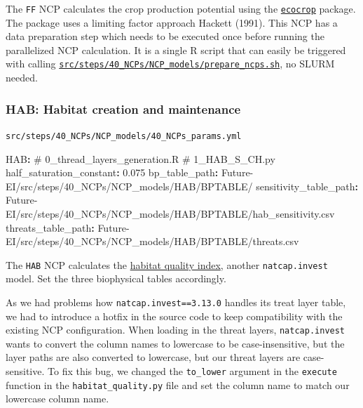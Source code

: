 \documentclass[
  letterpaper,
  DIV=11,
  numbers=noendperiod]{scrreprt}
\newenvironment{Shaded}{\begin{snugshade}}{\end{snugshade}}
\newcommand{\AttributeTok}[1]{\textcolor[rgb]{0.40,0.45,0.13}{#1}}
\newcommand{\CommentTok}[1]{\textcolor[rgb]{0.37,0.37,0.37}{#1}}
\newcommand{\FloatTok}[1]{\textcolor[rgb]{0.68,0.00,0.00}{#1}}
\newcommand{\FunctionTok}[1]{\textcolor[rgb]{0.28,0.35,0.67}{#1}}
\newcommand{\KeywordTok}[1]{\textcolor[rgb]{0.00,0.23,0.31}{\textbf{#1}}}
\begin{document}
The \texttt{FF} NCP calculates the crop production potential using the
\href{https://cropmodels.r-universe.dev/Recocrop}{\texttt{ecocrop}}
package. The package uses a limiting factor approach Hackett (1991).
This NCP has a data preparation step which needs to be executed once
before running the parallelized NCP calculation. It is a single R script
that can easily be triggered with calling
\href{https://github.com/cbueth/Future-EI/tree/main/src/steps/40_NCPs/NCP_models/prepare_ncps.sh}{\texttt{src/steps/40\_NCPs/NCP\_models/prepare\_ncps.sh}},
no SLURM needed.

\subsubsection{HAB: Habitat creation and maintenance}\label{HAB}

\begin{codelisting}

\caption{\texttt{src/steps/40\_NCPs/NCP\_models/40\_NCPs\_params.yml}}

\begin{Shaded}
\begin{Highlighting}[]
\FunctionTok{HAB}\KeywordTok{:}
\CommentTok{  \# 0\_thread\_layers\_generation.R}
\CommentTok{  \# 1\_HAB\_S\_CH.py}
\AttributeTok{  }\FunctionTok{half\_saturation\_constant}\KeywordTok{:}\AttributeTok{ }\FloatTok{0.075}
\AttributeTok{  }\FunctionTok{bp\_table\_path}\KeywordTok{:}
\AttributeTok{    Future{-}EI/src/steps/40\_NCPs/NCP\_models/HAB/BPTABLE/}
\AttributeTok{  }\FunctionTok{sensitivity\_table\_path}\KeywordTok{:}
\AttributeTok{    Future{-}EI/src/steps/40\_NCPs/NCP\_models/HAB/BPTABLE/hab\_sensitivity.csv}
\AttributeTok{  }\FunctionTok{threats\_table\_path}\KeywordTok{:}
\AttributeTok{    Future{-}EI/src/steps/40\_NCPs/NCP\_models/HAB/BPTABLE/threats.csv}
\end{Highlighting}
\end{Shaded}

\end{codelisting}

The \texttt{HAB} NCP calculates the
\href{https://invest.readthedocs.io/en/latest/models.html\#habitat-quality}{habitat
quality index}, another \texttt{natcap.invest} model. Set the three
biophysical tables accordingly.

As we had problems how \texttt{natcap.invest==3.13.0} handles its treat
layer table, we had to introduce a hotfix in the source code to keep
compatibility with the existing NCP configuration. When loading in the
threat layers, \texttt{natcap.invest} wants to convert the column names
to lowercase to be case-insensitive, but the layer paths are also
converted to lowercase, but our threat layers are case-sensitive. To fix
this bug, we changed the \texttt{to\_lower} argument in the
\texttt{execute} function in the \texttt{habitat\_quality.py} file and
set the column name to match our lowercase column name.
\end{document}
